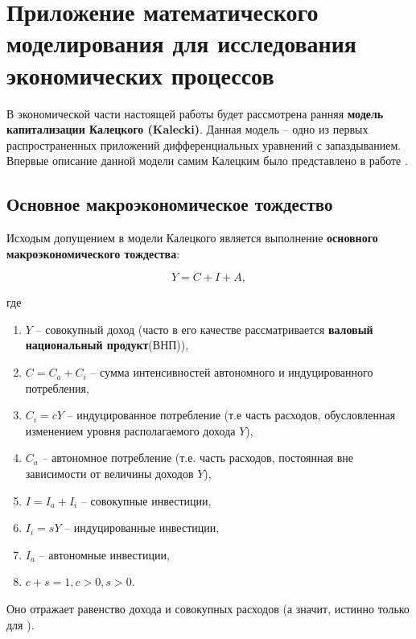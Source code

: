 \section{Приложение математического\\моделирования для исследования\\экономических процессов}

В экономической части настоящей работы будет рассмотрена ранняя \textbf{модель капитализации Калецкого (Kalecki)}. Данная модель \--- одно из первых распространенных приложений дифференциальных уравнений с запаздыванием. Впервые описание данной модели самим Калецким было представлено в работе \cite{bib:Kalecki}.

\subsection{Основное макроэкономическое тождество}

Исходым допущением в модели Калецкого является выполнение \textbf{основного макроэкономического тождества}:

\begin{equation}
Y = C + I + A,
\end{equation}

где

\begin{enumerate}
\item $Y$ \--- совокупный доход (часто в его качестве рассматривается \textbf{валовый национальный продукт}(ВНП)),
\item $C = C_a + C_i$ \--- сумма интенсивностей автономного и индуцированного потребления,
\item $C_i = c Y$ \--- индуцированное потребление (т.е часть расходов, обусловленная изменением уровня располагаемого дохода $Y$),
\item $C_a$ \--- автономное потребление (т.е. часть расходов, постоянная вне зависимости от величины доходов $Y$),
\item $I = I_a + I_i$ \--- совокупные инвестиции,
\item $I_i = s Y$ \--- индуцированные инвестиции,
\item $I_a$ \--- автономные инвестиции,
\item $c+s=1, c>0, s>0$.
\end{enumerate}

Оно отражает равенство дохода и совокупных расходов (а значит, истинно только для ).

